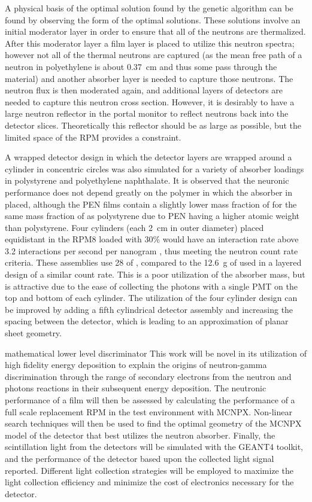 A physical basis of the optimal solution found by the genetic algorithm can be found by observing the form of the optimal solutions.
These solutions involve an initial moderator layer in order to ensure that all of the neutrons are thermalized.
After this moderator layer a film layer is placed to utilize this neutron spectra; however not all of the thermal neutrons are captured (as the mean free path of a neutron in polyethylene is about \SI{0.37}{\cm} and thus some pass through the material) and another absorber layer is needed to capture those neutrons.  
The neutron flux is then moderated again, and additional layers of detectors are needed to capture this neutron cross section.
However, it is desirably to have a large neutron reflector in the portal monitor to reflect neutrons back into the detector slices. 
Theoretically this reflector should be as large as possible, but the limited space of the RPM provides a constraint.

A wrapped detector design in which the detector layers are wrapped around a cylinder in concentric circles was also simulated for a variety of absorber loadings in polystyrene and polyethylene naphthalate.
It is observed that the neuronic performance does not depend greatly on the polymer in which the absorber in placed, although the PEN films contain a slightly lower mass fraction of  for the same mass fraction of  as polystyrene due to PEN having a higher atomic weight than polystyrene.
Four cylinders (each \SI{2}{\cm} in outer diameter) placed equidistant in the RPM8 loaded with 30\%  would have an interaction rate above 3.2 interactions per second per nanogram , thus meeting the neutron count rate criteria. These assemblies use \SI{28}{\grams} of , compared to the \SI{12.6}{\gram} of  used in a layered design of a similar count rate.
This is a poor utilization of the absorber mass, but is attractive due to the ease of collecting the photons with a single PMT on the top and bottom of each cylinder.
The  utilization of the four cylinder design can be improved by adding a fifth cylindrical detector assembly and increasing the spacing between the detector, which is leading to an approximation of planar sheet geometry.


mathematical lower level discriminator 
This work will be novel in its utilization of high fidelity energy deposition to explain the origins of neutron-gamma discrimination through the range of secondary electrons from the neutron and photons reactions in their subsequent energy deposition.
The neutronic performance of a film will then be assessed by calculating the performance of a full scale replacement RPM in the test environment with MCNPX.
Non-linear search techniques will then be used to find the optimal geometry of the MCNPX model of the detector that best utilizes the neutron absorber.
Finally, the scintillation light from the detectors will be simulated with the GEANT4 toolkit, and the performance of the detector based upon the collected light signal reported.
Different light collection strategies will be employed to maximize the light collection efficiency and minimize the cost of electronics necessary for the detector.



